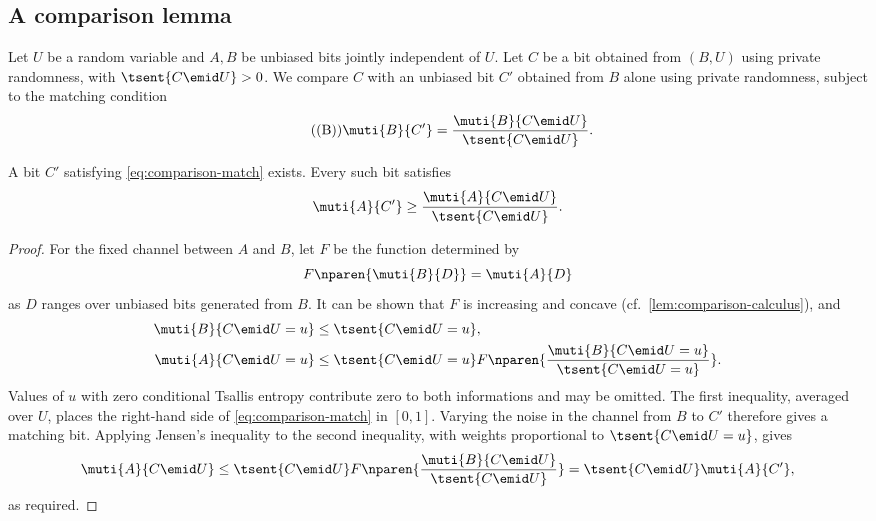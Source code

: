 \subsection{A comparison lemma}
\label{sec:comparison}

Let $U$ be a random variable and $A,B$ be unbiased bits jointly
independent of $U$. Let $C$ be a bit obtained from $(B,U)$ using
private randomness, with $\tsent{C\emid U}>0$.
We compare $C$ with an unbiased bit $C'$ obtained from $B$ alone
using private randomness, subject to the matching condition
\begin{equation}
  \tag{(B)}
  \label{eq:comparison-match}
  \muti{B}{C'}=
  \frac{\muti{B}{C\emid U}}{\tsent{C\emid U}}.
\end{equation}

\begin{lemma}
\label{lem:comparison}
A bit $C'$ satisfying \eqref{eq:comparison-match} exists.
Every such bit satisfies
\begin{equation*}
  \muti{A}{C'}\ge
  \frac{\muti{A}{C\emid U}}{\tsent{C\emid U}}.
\end{equation*}
\end{lemma}
\begin{proof}
For the fixed channel between $A$ and $B$, let $F$ be the
function determined by
\begin{equation*}
F\nparen{\muti{B}{D}}=\muti{A}{D}
\end{equation*}
as $D$ ranges over unbiased bits generated from $B$.
It can be shown that $F$ is increasing and
concave (cf.\ \autoref{lem:comparison-calculus}), and
\begin{align*}
  \muti{B}{C\emid U=u}&\le\tsent{C\emid U=u},\\
  \muti{A}{C\emid U=u}
  &\le\tsent{C\emid U=u}
  F\nparen{\frac{\muti{B}{C\emid U=u}}
  {\tsent{C\emid U=u}}}.
\end{align*}
Values of $u$ with zero conditional Tsallis entropy contribute
zero to both informations and may be omitted.
The first inequality, averaged over $U$, places the right-hand
side of \eqref{eq:comparison-match} in $[0,1]$.
Varying the noise in the channel from $B$ to $C'$ therefore
gives a matching bit.
Applying Jensen's inequality to the second inequality, with weights
proportional to $\tsent{C\emid U=u}$, gives
\begin{equation*}
  \muti{A}{C\emid U}
  \le\tsent{C\emid U}
  F\nparen{\frac{\muti{B}{C\emid U}}{\tsent{C\emid U}}}
  =\tsent{C\emid U}\muti{A}{C'},
\end{equation*}
as required.
\end{proof}

